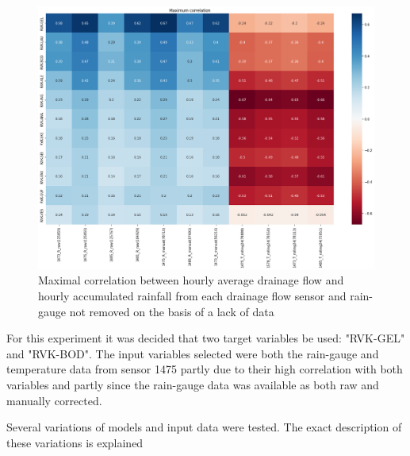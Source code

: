 \begin{figure}
\centering\includegraphics[width=\textwidth]{Pictures/Plots/max_corr_pairs.png}
\caption{Maximal correlation between hourly average drainage flow and hourly accumulated rainfall from each drainage flow sensor and rain-gauge not removed on the basis of a lack of data}
\label{fig:maxcorrpairs}
\end{figure}

For this experiment it was decided that two target variables be used: "RVK-GEL" and "RVK-BOD". The input variables selected were both the rain-gauge and temperature data from sensor 1475 partly due to their high correlation with both variables and partly since the rain-gauge data was available as both raw and manually corrected.


Several variations of models and input data were tested. The exact description of these variations is explained 

